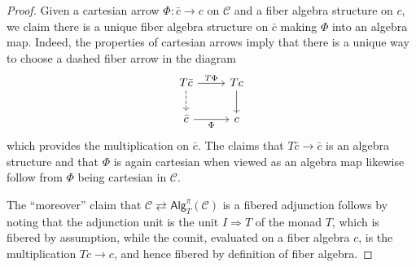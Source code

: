\documentclass[a4paper,10pt
,draft
]{article}%
\numberwithin{equation}{section}
\numberwithin{figure}{section}
\theoremstyle{definition} %
\newcommand{\1}{\ensuremath{\mathbbm 1}}%
\begin{document}
\begin{proof}
	Given a cartesian arrow $\Phi \colon \bar{c} \to c$ on $\mathcal{C}$ and a fiber algebra structure on $c$, we claim there is a unique fiber algebra structure on $\bar{c}$ making $\Phi$ into an algebra map. Indeed, the properties of cartesian arrows imply that there is a unique way to choose a dashed fiber arrow in the diagram
	\[
	\begin{tikzcd}
	T \bar{c} \ar{r}{T \Phi} \ar[dashed]{d} & T c \ar{d}
	\\
	\bar{c} \ar{r}[swap]{\Phi} & c
	\end{tikzcd}
	\]
	which provides the multiplication on $\bar{c}$.
	The claims that $T\bar{c} \to \bar{c}$ is an algebra structure and that 
	$\Phi$ is again cartesian when viewed as an algebra map likewise follow from 
	$\Phi$ being cartesian in $\mathcal{C}$.
	
	The ``moreover'' claim that 
	$\mathcal{C} \rightleftarrows \mathsf{Alg}^{\pi}_T(\mathcal{C})$
	is a fibered adjunction
	follows by noting that the adjunction unit is the unit
	$I \Rightarrow T$ of the monad $T$, 
	which is fibered by assumption,
	while the counit, evaluated on a fiber algebra $c$, is the multiplication $Tc \to c$, and hence fibered by definition of fiber algebra.
\end{proof}
\end{document}
